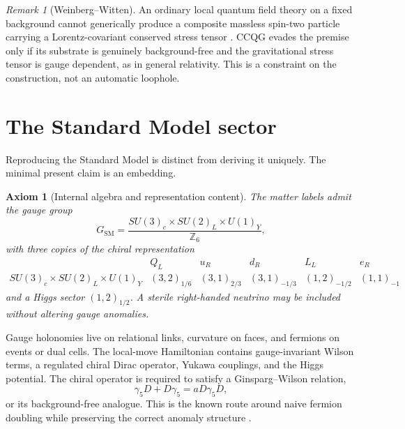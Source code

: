 \documentclass[11pt]{article}
\newtheorem{axiom}[definition]{Axiom}
\theoremstyle{remark}
\newtheorem{remark}[definition]{Remark}
\newcommand{\gsm}{G_{\mathrm{SM}}}
\begin{document}
\begin{remark}[Weinberg--Witten]
An ordinary local quantum field theory on a fixed background cannot
generically produce a composite massless spin-two particle carrying a
Lorentz-covariant conserved stress tensor \cite{WeinbergWitten1980}.
CCQG evades the premise only if its substrate is genuinely
background-free and the gravitational stress tensor is gauge dependent,
as in general relativity.  This is a constraint on the construction, not
an automatic loophole.
\end{remark}

\section{The Standard Model sector}

Reproducing the Standard Model is distinct from deriving it uniquely.
The minimal present claim is an embedding.

\begin{axiom}[Internal algebra and representation content]
The matter labels admit the gauge group
\begin{equation}
  \gsm
  =
  \frac{SU(3)_c\times SU(2)_L\times U(1)_Y}{\mathbb Z_6},
\end{equation}
with three copies of the chiral representation
\begin{equation}
\begin{array}{c|ccccc}
 & Q_L & u_R & d_R & L_L & e_R\\
\hline
SU(3)_c\times SU(2)_L\times U(1)_Y
&(3,2)_{1/6}&(3,1)_{2/3}&(3,1)_{-1/3}
&(1,2)_{-1/2}&(1,1)_{-1}
\end{array}
\end{equation}
and a Higgs sector \((1,2)_{1/2}\).  A sterile right-handed neutrino may
be included without altering gauge anomalies.
\end{axiom}

Gauge holonomies live on relational links, curvature on faces, and
fermions on events or dual cells.  The local-move Hamiltonian contains
gauge-invariant Wilson terms, a regulated chiral Dirac operator, Yukawa
couplings, and the Higgs potential.  The chiral operator is required to
satisfy a Ginsparg--Wilson relation,
\begin{equation}
  \gamma_5D+D\gamma_5
  =aD\gamma_5D,
  \label{eq:GW}
\end{equation}
or its background-free analogue.  This is the known route around naive
fermion doubling while preserving the correct anomaly structure
\cite{GinspargWilson1982,Luscher1999}.
\end{document}
